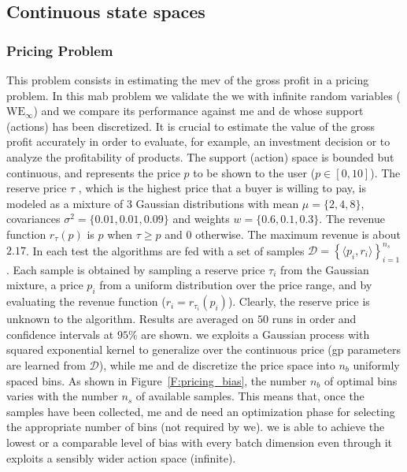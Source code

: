 \subsection{Continuous state spaces}

\subsubsection{Pricing Problem}
This problem consists in estimating the \gls{mev} of the gross profit in a pricing problem. In this \gls{mab} problem we validate the \gls{we} with infinite random variables ($\text{WE}_{\infty}$) and we compare its performance against \gls{me} and \gls{de} whose support (actions) has been discretized.
It is crucial to estimate the value of the gross profit accurately in order to evaluate, for example, an investment decision or to analyze the profitability of products.
The support (action) space is bounded but continuous, and represents the price $p$ to be shown to the user ($p \in [0,10]$).
The reserve price $\tau$ , which is the highest price that a buyer is willing to pay, is modeled as a mixture of $3$ Gaussian distributions with mean $\mu=\lbrace 2, 4, 8 \rbrace$, covariances $\sigma^2= \lbrace 0.01, 0.01, 0.09 \rbrace$ and weights $w = \lbrace 0.6, 0.1, 0.3 \rbrace$.
The revenue function $r_{\tau}(p)$ is $p$ when $\tau \geq p$ and $0$ otherwise.
The maximum revenue is about $2.17$.
In each test the algorithms are fed with a set of samples $\mathcal{D} = \left\{ \langle p_i, r_i \rangle \right\}_{i=1}^{n_s}$. Each sample is obtained by sampling a reserve price $\tau_i$ from the Gaussian mixture, a price $p_i$ from a uniform distribution over the price range, and by evaluating the revenue function ($r_i=r_{\tau_i}(p_i)$). Clearly, the reserve price is unknown to the algorithm.
Results are averaged on $50$ runs in order and confidence intervals at $95\%$ are shown.
\gls{we} exploits a Gaussian process with squared exponential kernel to generalize over the continuous price (\gls{gp} parameters are learned from $\mathcal{D}$), while \gls{me} and \gls{de} discretize the price space into $n_b$ uniformly spaced bins.
As shown in Figure~\ref{F:pricing_bias}, the number $n_b$ of optimal bins varies with the number $n_s$ of available samples.
This means that, once the samples have been collected, \gls{me} and \gls{de} need an optimization phase for selecting the appropriate number of bins (not required by \gls{we}). 
\gls{we} is able to achieve the lowest or a comparable level of bias with every batch dimension even through it exploits a sensibly wider action space (infinite).
